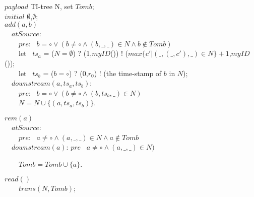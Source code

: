 {\renewcommand{\algorithmcfname}{CRDT Implementation}
\noindent
\noindent\begin{algorithm}[H]
$\mathit{payload}$ TI-tree N, set $\mathit{Tomb}$; \\
$\mathit{initial}$ $\emptyset$,$\emptyset$; \\

$add(a,b)$ \\
\ \ $\mathit{atSource}$: \\
\ \ \ \ $\mathit{pre}$: \ $b = \circ \vee ( b \neq \circ \wedge (b,\_,\_) \in N \wedge b \notin \mathit{Tomb})$ \\



\ \ \ \ let \ $ts_a$ = ($N = \emptyset$) ? (1,$\mathit{myID}$()) ! ($\mathit{max}\{ c' \vert (\_,(\_,c'),\_) \in N \} +1$,$\mathit{myID}$()); \\
\ \ \ \ let \ $ts_b$ = ($b = \circ$) ? (0,$r_0$) ! (the time-stamp of $b$ in $N$); \\

\ \ $\mathit{downstream}(a,ts_a,ts_b)$: \\
\ \ \ \ $\mathit{pre}$: \ $b = \circ \vee ( b \neq \circ \wedge (b,ts_b,\_) \in N)$ \\

\ \ \ \ $N = N \cup \{ (a,ts_a,ts_b) \}$.


$rem(a)$ \\
\ \ $\mathit{atSource}$: \\
\ \ \ \ $\mathit{pre}$: \ $a \neq \circ \wedge (a,\_,\_) \in N \wedge a \notin \mathit{Tomb}$ \\

\ \ $\mathit{downstream}(a)$: $\mathit{pre}$ \ $a \neq \circ \wedge (a,\_,\_) \in N)$

\ \ \ \ $\mathit{Tomb} = \mathit{Tomb} \cup \{ a \}$.

$read()$ \\
\ \ \ \ \KwRet $\mathit{trans}(N,\mathit{Tomb})$; \\


\end{algorithm}}
